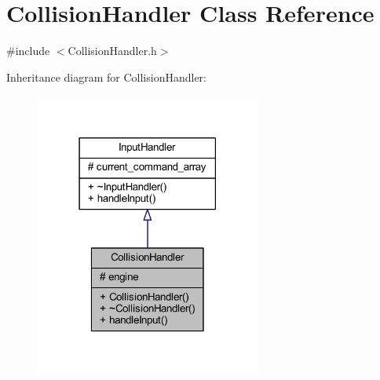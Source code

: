 \hypertarget{class_collision_handler}{}\section{Collision\+Handler Class Reference}
\label{class_collision_handler}


{\ttfamily \#include $<$Collision\+Handler.\+h$>$}



Inheritance diagram for Collision\+Handler\+:
\nopagebreak
\begin{figure}[H]
\begin{center}
\leavevmode
\includegraphics[width=210pt]{class_collision_handler__inherit__graph}
\end{center}
\end{figure}


